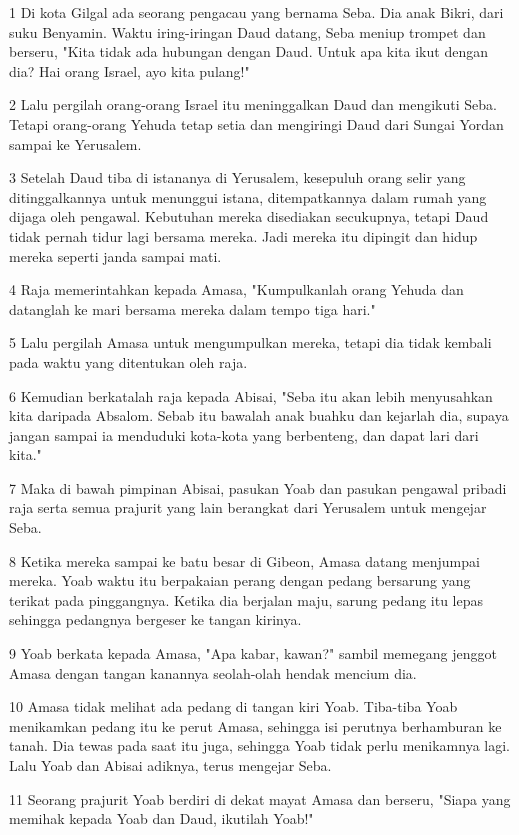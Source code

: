 \par 1 Di kota Gilgal ada seorang pengacau yang bernama Seba. Dia anak Bikri, dari suku Benyamin. Waktu iring-iringan Daud datang, Seba meniup trompet dan berseru, "Kita tidak ada hubungan dengan Daud. Untuk apa kita ikut dengan dia? Hai orang Israel, ayo kita pulang!"
\par 2 Lalu pergilah orang-orang Israel itu meninggalkan Daud dan mengikuti Seba. Tetapi orang-orang Yehuda tetap setia dan mengiringi Daud dari Sungai Yordan sampai ke Yerusalem.
\par 3 Setelah Daud tiba di istananya di Yerusalem, kesepuluh orang selir yang ditinggalkannya untuk menunggui istana, ditempatkannya dalam rumah yang dijaga oleh pengawal. Kebutuhan mereka disediakan secukupnya, tetapi Daud tidak pernah tidur lagi bersama mereka. Jadi mereka itu dipingit dan hidup mereka seperti janda sampai mati.
\par 4 Raja memerintahkan kepada Amasa, "Kumpulkanlah orang Yehuda dan datanglah ke mari bersama mereka dalam tempo tiga hari."
\par 5 Lalu pergilah Amasa untuk mengumpulkan mereka, tetapi dia tidak kembali pada waktu yang ditentukan oleh raja.
\par 6 Kemudian berkatalah raja kepada Abisai, "Seba itu akan lebih menyusahkan kita daripada Absalom. Sebab itu bawalah anak buahku dan kejarlah dia, supaya jangan sampai ia menduduki kota-kota yang berbenteng, dan dapat lari dari kita."
\par 7 Maka di bawah pimpinan Abisai, pasukan Yoab dan pasukan pengawal pribadi raja serta semua prajurit yang lain berangkat dari Yerusalem untuk mengejar Seba.
\par 8 Ketika mereka sampai ke batu besar di Gibeon, Amasa datang menjumpai mereka. Yoab waktu itu berpakaian perang dengan pedang bersarung yang terikat pada pinggangnya. Ketika dia berjalan maju, sarung pedang itu lepas sehingga pedangnya bergeser ke tangan kirinya.
\par 9 Yoab berkata kepada Amasa, "Apa kabar, kawan?" sambil memegang jenggot Amasa dengan tangan kanannya seolah-olah hendak mencium dia.
\par 10 Amasa tidak melihat ada pedang di tangan kiri Yoab. Tiba-tiba Yoab menikamkan pedang itu ke perut Amasa, sehingga isi perutnya berhamburan ke tanah. Dia tewas pada saat itu juga, sehingga Yoab tidak perlu menikamnya lagi. Lalu Yoab dan Abisai adiknya, terus mengejar Seba.
\par 11 Seorang prajurit Yoab berdiri di dekat mayat Amasa dan berseru, "Siapa yang memihak kepada Yoab dan Daud, ikutilah Yoab!"
